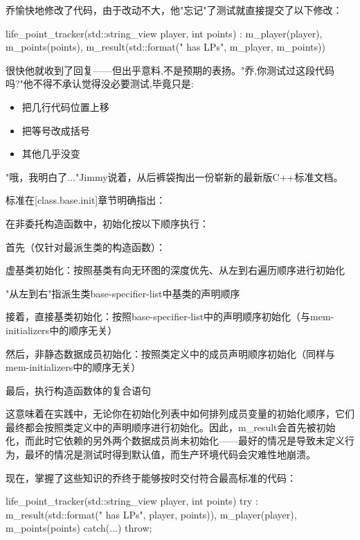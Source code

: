 乔愉快地修改了代码，由于改动不大，他"忘记"了测试就直接提交了以下修改：

\begin{cpp}
life_point_tracker(std::string_view player, int points)
: m_player(player), m_points(points),
  m_result(std::format("{} has {} LPs", m_player, m_points)) {}
\end{cpp}

很快他就收到了回复——但出乎意料,不是预期的表扬。"乔,你测试过这段代码吗?"他不得不承认觉得没必要测试,毕竟只是: 

\begin{itemize}
\item 
把几行代码位置上移

\item 
把等号改成括号

\item 
其他几乎没变
\end{itemize}

"哦，我明白了..."Jimmy说着，从后裤袋掏出一份崭新的最新版C++标准文档。

标准在[class.base.init]章节明确指出：

\begin{shell}
在非委托构造函数中，初始化按以下顺序执行：

首先（仅针对最派生类的构造函数）：

虚基类初始化：按照基类有向无环图的深度优先、从左到右遍历顺序进行初始化

"从左到右"指派生类base-specifier-list中基类的声明顺序

接着，直接基类初始化：按照base-specifier-list中的声明顺序初始化（与mem-initializers中的顺序无关）

然后，非静态数据成员初始化：按照类定义中的成员声明顺序初始化（同样与mem-initializers中的顺序无关）

最后，执行构造函数体的复合语句
\end{shell}

这意味着在实践中，无论你在初始化列表中如何排列成员变量的初始化顺序，它们最终都会按照类定义中的声明顺序进行初始化。因此，m\_result会首先被初始化，而此时它依赖的另外两个数据成员尚未初始化——最好的情况是导致未定义行为，最坏的情况是测试时得到默认值，而生产环境代码会灾难性地崩溃。

现在，掌握了这些知识的乔终于能够按时交付符合最高标准的代码：

\begin{cpp}
life_point_tracker(std::string_view player, int points)
try :
  m_result(std::format("{} has {} LPs", player, points)),
  m_player(player),
  m_points(points)
{ 
}
catch(...) {throw;}
\end{cpp}

